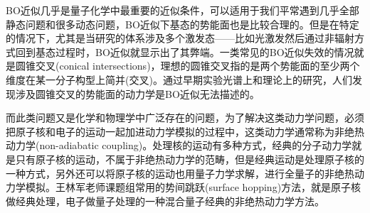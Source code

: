\documentclass{article}
\numberwithin{equation}{section}
\begin{document}
    BO近似几乎是量子化学中最重要的近似条件，可以适用于我们平常遇到几乎全部静态问题和很多动态问题，BO近似下基态的势能面也是比较合理的。但是在特定的情况下，尤其是当研究的体系涉及多个激发态——比如光激发然后通过非辐射方式回到基态过程时，BO近似就显示出了其弊端。一类常见的BO近似失效的情况就是圆锥交叉(conical intersections)，理想的圆锥交叉指的是两个势能面的至少两个维度在某一分子构型上简并(交叉)。通过早期实验光谱上和理论上的研究，人们发现涉及圆锥交叉的势能面的动力学是BO近似无法描述的。
    
    而此类问题又是化学和物理学中广泛存在的问题，为了解决这类动力学问题，必须把原子核和电子的运动一起加进动力学模拟的过程中，这类动力学通常称为非绝热动力学(non-adiabatic coupling)。处理核的运动有多种方式，经典的分子动力学就是只有原子核的运动，不属于非绝热动力学的范畴，但是经典运动是处理原子核的一种方式，另外还可以将原子核的运动也用量子力学求解，进行全量子的非绝热动力学模拟。王林军老师课题组常用的势间跳跃(surface hopping)方法，就是原子核做经典处理，电子做量子处理的一种混合量子经典的非绝热动力学方法。
\end{document}
